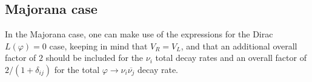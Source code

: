 \documentclass[
reprint,
superscriptaddress,
showpacs,
preprintnumbers,
nofootinbib,
nobibnotes,
amsmath,
amssymb, 
aps,
prd,
floatfix
]{revtex4-1}
\renewcommand{\phi}{\varphi}
\begin{document}
\subsection{Majorana case}

In the Majorana case, one can make use of the expressions for the Dirac $L(\phi)=0$ case, keeping in mind that $V_R=V_L$, and that an additional overall factor of $2$ should be included for the $\nu_i$ total decay rates and an overall factor of $2/(1+\delta_{ij})$ for the total $\phi\to \nu_i \overline{\nu_j}$ decay rate.
\vfill

{}
\end{document}
